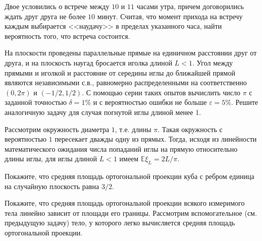 \begin{problem}
Двое условились о встрече между $10$ и $11$ часами утра, причем договорились ждать друг друга не более $10$ минут. Считая, что 
момент прихода на встречу каждым выбирается <<наудачу>> в пределах указанного часа, найти вероятность того, что встреча состоится. 
\end{problem}


\begin{problem}
На плоскости проведены параллельные прямые на единичном расстоянии друг от друга, и на плоскость наугад бросается иголка длиной $L<1$. 
Угол между прямыми и иголкой и расстояние от середины иглы до ближайшей прямой являются независимыми с.в., равномерно распределенными 
на соответственно $(0,2\pi)$ и $(-1/2,1/2)$. С помощью серии таких опытов вычислить число $\pi$ с заданной точностью 
$\delta=1\%$ и с вероятностью ошибки не больше $\varepsilon=5\%$. Решите аналогичную задачу для случая погнутой иглы длиной менее 1.
\end{problem}

\begin{ordre}

Рассмотрим окружность диаметра $1$, т.е. длины $\pi$. Такая окружность с вероятностью $1$ пересекает дважды одну из прямых. 
Тогда, исходя из линейности математического ожидания числа попаданий иглы на прямую относительно длины иглы, для иглы длиной $L<1$ 
имеем ${\mathbb E}\xi_L = 2L/\pi$. 

\end{ordre}



\begin{problem}
Покажите, что средняя площадь ортогональной проекции куба с ребром единица на случайную плоскость равна $3/2$. 
\end{problem}

\begin{ordre}
Покажите, что  средняя площадь  ортогональной проекции всякого измеримого тела 
линейно зависит от площади его границы. 
Рассмотрим вспомогательное (см. предыдущую задачу) тело, у которого легко вычисляется средняя площадь ортогональной проекции. 
\end{ordre}


